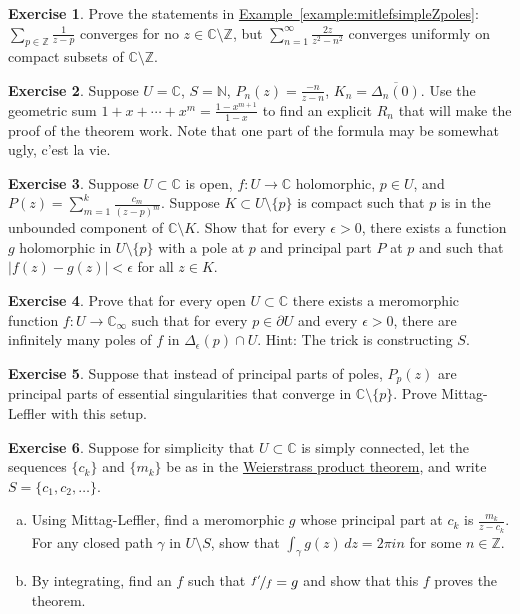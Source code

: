 \documentclass[12pt,openany]{book}
\newcommand{\sabs}[1]{\lvert {#1} \rvert}
\newcommand{\C}{{\mathbb{C}}}
\newcommand{\Z}{{\mathbb{Z}}}
\newcommand{\N}{{\mathbb{N}}}
\theoremstyle{plain}
\theoremstyle{remark}
\theoremstyle{definition}
\newenvironment{exbox}{%
    \def\FrameCommand{\vrule width 1pt \relax\hspace{10pt}}%
    \MakeFramed{\advance\hsize-\width\FrameRestore}%
}{%
    \endMakeFramed
}
\newenvironment{exparts}{%
    \leavevmode\begin{enumerate}[a),noitemsep,topsep=0pt,parsep=0pt,partopsep=0pt]
}{%
    \end{enumerate}
}
\theoremstyle{exercise}
\newtheorem{exercise}{Exercise}[section]
\theoremstyle{example}
\newcommand{\exampleref}[1]{\hyperref[#1]{Example~\ref*{#1}}}
\begin{document}
\begin{exbox}
\begin{exercise} \label{exercise:mitlefsimpleZpoles}
Prove the statements in \exampleref{example:mitlefsimpleZpoles}:
$\sum_{p\in \Z} \frac{1}{z-p}$
converges for no $z \in \C \setminus \Z$, but
$\sum_{n=1}^\infty
\frac{2z}{z^2-n^2}$
converges uniformly on compact subsets of $\C \setminus \Z$.
\end{exercise}

\begin{exercise}\label{exercise:mitlefsimpleNpoles}
Suppose $U = \C$, $S = \N$, $P_n(z) = \frac{-n}{z-n}$, $K_n =
\overline{\Delta_n(0)}$.  Use the geometric sum $1+x+\cdots+x^m =
\frac{1-x^{m+1}}{1-x}$ to find an explicit $R_n$ that will make the proof
of the theorem work.
Note that one part of the formula may be somewhat ugly, c'est la vie.
\end{exercise}

\begin{exercise}
Suppose $U \subset \C$ is open, $f \colon U \to \C$ holomorphic,
$p \in U$, and
$P(z) = \sum_{m=1}^{k} \frac{c_m}{{(z-p)}^m}$.
Suppose
$K \subset U \setminus \{ p \}$ is compact such that $p$ is in the unbounded
component of $\C \setminus K$.  Show that for every $\epsilon > 0$,
there exists a function $g$ holomorphic in $U \setminus \{ p \}$
with a pole at $p$ and principal part $P$ at $p$ and such that
$\sabs{f(z)-g(z)} < \epsilon$ for all $z \in K$.
\end{exercise}

\begin{exercise}
Prove that for every open $U \subset \C$ there exists a meromorphic function
$f \colon U \to \C_\infty$ such that for every $p \in \partial U$
and every $\epsilon > 0$, there are infinitely many poles of $f$ in
$\Delta_{\epsilon}(p) \cap U$.  Hint: The trick is constructing $S$.
\end{exercise}

\begin{exercise}
Suppose that instead of principal parts of poles, $P_p(z)$ are principal
parts of essential singularities that converge in $\C \setminus \{ p \}$.
Prove Mittag-Leffler with this setup.
\end{exercise}

\begin{exercise}
Suppose for simplicity that $U \subset \C$ is simply connected, let
the sequences
$\{c_k\}$ and $\{m_k\}$ be as in the
\hyperref[thm:weierprod]{Weierstrass product theorem}, and write
$S = \{ c_1,c_2,\ldots \}$.
\begin{exparts}
\item
Using Mittag-Leffler,
find a meromorphic $g$ whose principal part at $c_k$ is $\frac{m_k}{z-c_k}$.
For any closed path $\gamma$ in $U \setminus S$, show that
$\int_\gamma g(z)\, dz = 2\pi i n$ for some $n \in \Z$.
\item
By integrating, find an $f$ such that $\nicefrac{f'}{f} = g$ and show that this $f$ proves the theorem.
\end{exparts}
\end{exercise}
\end{exbox}
\end{document}
